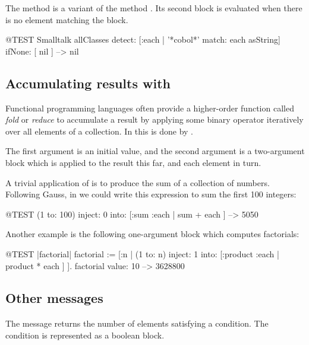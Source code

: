 \documentclass[a4paper,10pt,twoside]{book}
\begin{document}

The method  is a variant of the method . Its second block is evaluated
when there is no element matching the block.

\begin{code}{@TEST}
Smalltalk allClasses detect: [:each | '*cobol*' match: each asString] ifNone: [ nil ] --> nil
\end{code}

\subsection{Accumulating results with }
Functional programming languages often provide a higher-order function called \emph{fold} or \emph{reduce} to accumulate a result by applying some binary operator iteratively over all elements of a collection.
In \pharo this is done by .

The first argument is an initial value, and the second argument is a two-argument block which is applied to the result this far, and each element in turn.

A trivial application of  is to produce the sum of a collection of numbers.
Following Gauss, in \pharo we could write this expression to sum the first 100 integers:
\begin{code}{@TEST}
(1 to: 100) inject: 0 into: [:sum :each | sum + each ] --> 5050
\end{code}

Another example is the following one-argument block which computes factorials:
\begin{code}{@TEST |factorial|}
factorial := [:n | (1 to: n) inject: 1 into: [:product :each | product * each ] ].
factorial value: 10 --> 3628800
\end{code}

\subsection{Other messages}

\paragraph{} The message  returns the number of elements satisfying a condition.  The condition is represented as a boolean block.
\end{document}
